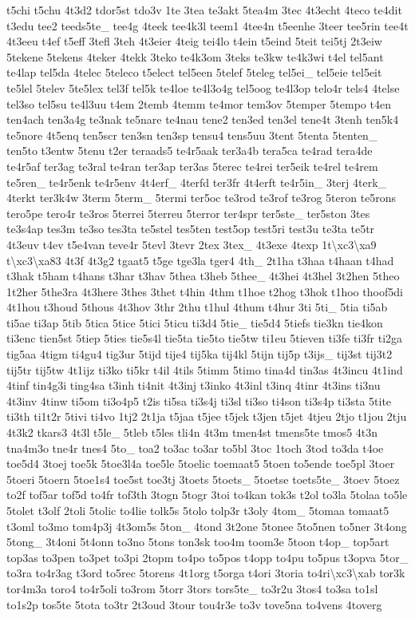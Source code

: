 \begin{DoxyCompactItemize}
t5chi t5chu 4t3d2 tdor5st tdo3v 1te 3tea te3akt 5tea4m 3tec 4t3echt 4teco te4dit t3edu tee2 teeds5te\-\_\- tee4g 4teek tee4k3l teem1 4tee4n t5eenhe 3teer tee5rin tee4t 4t3eeu t4ef t5eff 3tefl 3teh 4t3eier 4teig tei4lo t4ein t5eind 5teit tei5tj 2t3eiw 5tekene 5tekens 4teker 4tekk 3teko te4k3om 3teks te3kw te4k3wi t4el tel5ant te4lap tel5da 4telec 5teleco t5elect tel5een 5telef 5teleg tel5ei\-\_\- tel5eie tel5eit te5lel 5telev 5te5lex tel3f tel5k te4loe te4l3o4g tel5oog te4l3op telo4r tels4 4telse tel3so tel5su te4l3uu t4em 2temb 4temm te4mor tem3ov 5temper 5tempo t4en ten4ach ten3a4g te3nak te5nare te4nau tene2 ten3ed ten3el tene4t 3tenh ten5k4 te5nore 4t5enq ten5scr ten3sn ten3sp tensu4 tens5uu 3tent 5tenta 5tenten\-\_\- ten5to t3entw 5tenu t2er teraads5 te4r5aak ter3a4b tera5ca te4rad tera4de te4r5af ter3ag te3ral te4ran ter3ap ter3as 5terec te4rei ter5eik te4rel te4rem te5ren\-\_\- te4r5enk te4r5env 4t4erf\-\_\- 4terfd ter3fr 4t4erft te4r5in\-\_\- 3terj 4terk\-\_\- 4terkt ter3k4w 3term 5term\-\_\- 5termi ter5oc te3rod te3rof te3rog 5teron te5rons tero5pe tero4r te3ros 5terrei 5terreu 5terror ter4spr ter5ste\-\_\- ter5ston 3tes te3s4ap tes3m te3so tes3ta te5stel tes5ten test5op test5ri test3u te3ta te5tr 4t3euv t4ev t5e4van teve4r 5tevl 3tevr 2tex 3tex\-\_\- 4t3exe 4texp 1t\textbackslash{}xc3\textbackslash{}xa9 t\textbackslash{}xc3\textbackslash{}xa83 4t3f 4t3g2 tgaat5 t5ge tge3la tger4 4th\-\_\- 2t1ha t3haa t4haan t4had t3hak t5ham t4hans t3har t3hav 5thea t3heb 5thee\-\_\- 4t3hei 4t3hel 3t2hen 5theo 1t2her 5the3ra 4t3here 3thes 3thet t4hin 4thm t1hoe t2hog t3hok t1hoo thoof5di 4t1hou t3houd 5thous 4t3hov 3thr 2thu t1hul 4thum t4hur 3ti 5ti\-\_\- 5tia ti5ab ti5ae ti3ap 5tib 5tica 5tice 5tici 5ticu ti3d4 5tie\-\_\- tie5d4 5tiefs tie3kn tie4kon ti3enc tien5st 5tiep 5ties tie5s4l tie5ta tie5to tie5tw ti1eu 5tieven ti3fe ti3fr ti2ga tig5aa 4tigm ti4gu4 tig3ur 5tijd tije4 tij5ka tij4kl 5tijn tij5p t3ijs\-\_\- tij3st tij3t2 tij5tr tij5tw 4t1ijz ti3ko ti5kr t4il 4tils 5timm 5timo tina4d tin3as 4t3incu 4t1ind 4tinf tin4g3i ting4sa t3inh ti4nit 4t3inj t3inko 4t3inl t3inq 4tinr 4t3ins ti3nu 4t3inv 4tinw ti5om ti3o4p5 t2is ti5sa ti3s4j ti3sl ti3so ti4son ti3s4p ti3sta 5tite ti3th ti1t2r 5tivi ti4vo 1tj2 2t1ja t5jaa t5jee t5jek t3jen t5jet 4tjeu 2tjo t1jou 2tju 4t3k2 tkars3 4t3l t5le\-\_\- 5tleb t5les tli4n 4t3m tmen4st tmens5te tmos5 4t3n tna4m3o tne4r tnes4 5to\-\_\- toa2 to3ac to3ar to5bl 3toc 1toch 3tod to3da t4oe toe5d4 3toej toe5k 5toe3l4a toe5le 5toelic toemaat5 5toen to5ende toe5pl 3toer 5toeri 5toern 5toe1s4 toe5st toe3tj 3toets 5toets\-\_\- 5toetse toets5te\-\_\- 3toev 5toez to2f tof5ar tof5d to4fr tof3th 3togn 5togr 3toi to4kan tok3s t2ol to3la 5tolaa to5le 5tolet t3olf 2toli 5tolic to4lie tolk5s 5tolo tolp3r t3oly 4tom\-\_\- 5tomaa tomaat5 t3oml to3mo tom4p3j 4t3om5s 5ton\-\_\- 4tond 3t2one 5tonee 5to5nen to5ner 3t4ong 5tong\-\_\- 3t4oni 5t4onn to3no 5tons ton3sk too4m toom3e 5toon t4op\-\_\- top5art top3as to3pen to3pet to3pi 2topm to4po to5pos t4opp to4pu to5pus t3opva 5tor\-\_\- to3ra to4r3ag t3ord to5rec 5torens 4t1org t5orga t4ori 3toria to4ri\textbackslash{}xc3\textbackslash{}xab tor3k tor4m3a toro4 to4r5oli to3rom 5torr 3tors tors5te\-\_\- to3r2u 3tos4 to3sa to1sl to1s2p tos5te 5tota to3tr 2t3oud 3tour tou4r3e to3v tove5na to4vens 4toverg 
\end{DoxyCompactItemize}
